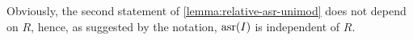Obviously, the second statement of \cref{lemma:relative-asr-unimod} does not depend on $R$, hence, as suggested by the notation, $\operatorname{asr}(I)$ is independent of $R$.

